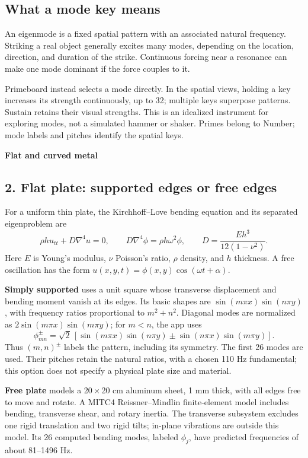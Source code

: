 \documentclass[11pt,letterpaper]{article}
\begin{document}
\subsection{What a mode key means}
An eigenmode is a fixed spatial pattern with an associated natural frequency. Striking a real object generally excites many modes, depending on the location, direction, and duration of the strike. Continuous forcing near a resonance can make one mode dominant if the force couples to it.

Primeboard instead selects a mode directly. In the spatial views, holding a key increases its strength continuously, up to 32; multiple keys superpose patterns. Sustain retains their visual strengths. This is an idealized instrument for exploring modes, not a simulated hammer or shaker. Primes belong to Number; mode labels and pitches identify the spatial keys.

\newpage
{\large\bfseries Flat and curved metal}\par
\subsection{2. Flat plate: supported edges or free edges}
For a uniform thin plate, the Kirchhoff--Love bending equation and its separated eigenproblem are
\[
 \rho h u_{tt}+D\nabla^4u=0,
 \qquad D\nabla^4\phi=\rho h\omega^2\phi,
 \qquad D=\frac{Eh^3}{12(1-\nu^2)}.
\]
Here \(E\) is Young's modulus, \(\nu\) Poisson's ratio, \(\rho\) density, and \(h\) thickness. A free oscillation has the form \(u(x,y,t)=\phi(x,y)\cos(\omega t+\alpha)\).

\textbf{Simply supported} uses a unit square whose transverse displacement and bending moment vanish at its edges. Its basic shapes are \(\sin(m\pi x)\sin(n\pi y)\), with frequency ratios proportional to \(m^2+n^2\). Diagonal modes are normalized as \(2\sin(m\pi x)\sin(m\pi y)\); for \(m<n\), the app uses
\[
 \phi_{mn}^{\pm}=\sqrt2\,[\sin(m\pi x)\sin(n\pi y)
 \pm\sin(n\pi x)\sin(m\pi y)].
\]
Thus \((m,n)^{\pm}\) labels the pattern, including its symmetry. The first 26 modes are used. Their pitches retain the natural ratios, with a chosen 110 Hz fundamental; this option does not specify a physical plate size and material.

\textbf{Free plate} models a 20\,$\times$\,20 cm aluminum sheet, 1 mm thick, with all edges free to move and rotate. A MITC4 Reissner--Mindlin finite-element model includes bending, transverse shear, and rotary inertia. The transverse subsystem excludes one rigid translation and two rigid tilts; in-plane vibrations are outside this model. Its 26 computed bending modes, labeled \(\phi_j\), have predicted frequencies of about 81--1496 Hz.
\end{document}
